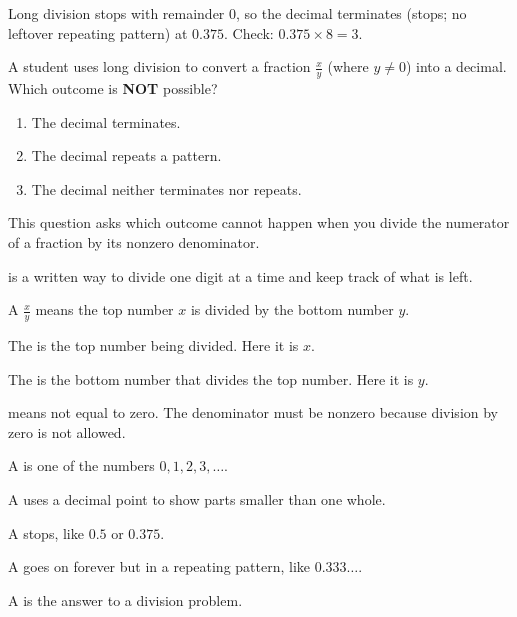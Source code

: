 
\noindent Long division stops with remainder $0$, so the decimal terminates
(stops; no leftover repeating pattern) at $0.375$. Check: $0.375 \times 8 = 3$.


\noindent A student uses long division to convert a fraction $\tfrac{x}{y}$ (where $y \neq 0$) into a decimal. Which outcome is \textbf{NOT} possible?

\begin{enumerate}[label=\Alph*), leftmargin=2.6em, itemsep=0.35\baselineskip, topsep=0.4\baselineskip]
  \item The decimal terminates.
  \item The decimal repeats a pattern.
  \item The decimal neither terminates nor repeats.
\end{enumerate}


\noindent This question asks which outcome cannot happen when you divide the
numerator of a fraction by its nonzero denominator.

\begin{words}
  \item {}is a written way to divide one digit at a time and keep track of what
        is left.
  \item A $\tfrac{x}{y}$ means the top number $x$ is divided by the bottom number $y$.
  \item The is the top number being divided. Here it is $x$.
  \item The is the bottom number that divides the top number. Here it is $y$.
  \item {}means not equal to zero. The denominator must be nonzero because division by
        zero is not allowed.
  \item A is one of the numbers $0, 1, 2, 3, \ldots$.
  \item A uses a decimal point to show parts smaller than one whole.
  \item A stops, like $0.5$ or $0.375$.
  \item A goes on forever but in a repeating pattern, like $0.333\ldots$.
  \item A is the answer to a division problem.
\end{words}

